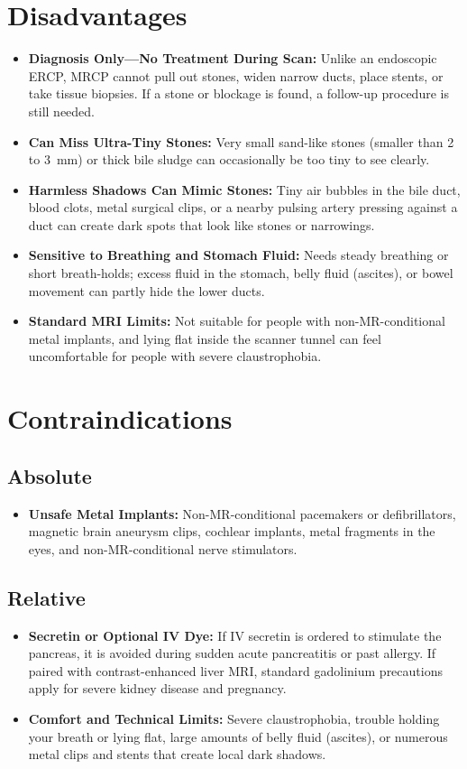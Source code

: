 \section{Disadvantages}
\begin{itemize}
\item \textbf{Diagnosis Only---No Treatment During Scan:} Unlike an endoscopic ERCP, MRCP cannot pull out stones, widen narrow ducts, place stents, or take tissue biopsies. If a stone or blockage is found, a follow-up procedure is still needed.
\item \textbf{Can Miss Ultra-Tiny Stones:} Very small sand-like stones (smaller than 2 to 3~mm) or thick bile sludge can occasionally be too tiny to see clearly.
\item \textbf{Harmless Shadows Can Mimic Stones:} Tiny air bubbles in the bile duct, blood clots, metal surgical clips, or a nearby pulsing artery pressing against a duct can create dark spots that look like stones or narrowings.
\item \textbf{Sensitive to Breathing and Stomach Fluid:} Needs steady breathing or short breath-holds; excess fluid in the stomach, belly fluid (ascites), or bowel movement can partly hide the lower ducts.
\item \textbf{Standard MRI Limits:} Not suitable for people with non-MR-conditional metal implants, and lying flat inside the scanner tunnel can feel uncomfortable for people with severe claustrophobia.
\end{itemize}

\section{Contraindications}

\subsection{Absolute}
\begin{itemize}
\item \textbf{Unsafe Metal Implants:} Non-MR-conditional pacemakers or defibrillators, magnetic brain aneurysm clips, cochlear implants, metal fragments in the eyes, and non-MR-conditional nerve stimulators.
\end{itemize}

\subsection{Relative}
\begin{itemize}
\item \textbf{Secretin or Optional IV Dye:} If IV secretin is ordered to stimulate the pancreas, it is avoided during sudden acute pancreatitis or past allergy. If paired with contrast-enhanced liver MRI, standard gadolinium precautions apply for severe kidney disease and pregnancy.
\item \textbf{Comfort and Technical Limits:} Severe claustrophobia, trouble holding your breath or lying flat, large amounts of belly fluid (ascites), or numerous metal clips and stents that create local dark shadows.
\end{itemize}

